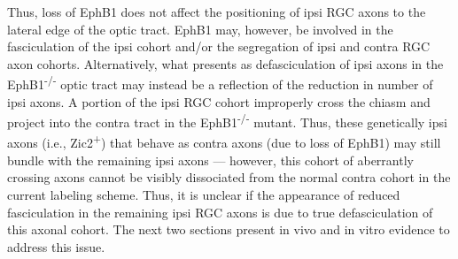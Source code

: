 Thus, loss of EphB1 does not affect the positioning of ipsi RGC axons to the lateral edge of the optic tract.
EphB1 may, however, be involved in the fasciculation of the ipsi cohort and/or the segregation of ipsi and contra RGC axon cohorts.
Alternatively, what presents as defasciculation of ipsi axons in the EphB1\textsuperscript{-/-} optic tract may instead be a reflection of the reduction in number of ipsi axons.
A portion of the ipsi RGC cohort improperly cross the chiasm and project into the contra tract in the EphB1\textsuperscript{-/-} mutant.
Thus, these genetically ipsi axons (i.e., Zic2\textsuperscript{+}) that behave as contra axons (due to loss of EphB1) may still bundle with the remaining ipsi axons --- however, this cohort of aberrantly crossing axons cannot be visibly dissociated from the normal contra cohort in the current labeling scheme.
Thus, it is unclear if the appearance of reduced fasciculation in the remaining ipsi RGC axons is due to true defasciculation of this axonal cohort.
The next two sections present in vivo and in vitro evidence to address this issue.
